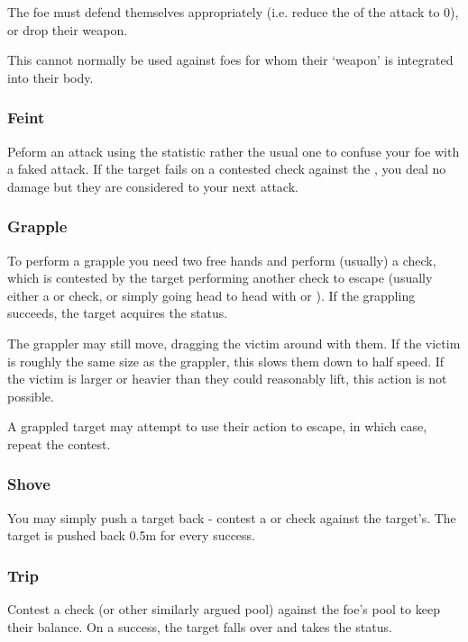 The foe must defend themselves appropriately (i.e. reduce the  of the attack to 0), or drop their weapon. 

This cannot normally be used against foes for whom their `weapon' is integrated into their body. 

\subsubsection{Feint}

Peform an attack using the  statistic rather the usual one to confuse your foe with a faked attack. If the target fails on a contested  check against the , you deal no damage but they are considered  to your next attack.  

\subsubsection{Grapple}

To perform a grapple you need two free hands and perform (usually) a  check, which is contested by the target performing another check to escape (usually either a  or  check, or simply going head to head with  or ). If the grappling succeeds, the target acquires the  status. 

The grappler may still move, dragging the victim around with them. If the victim is roughly the same size as the grappler, this slows them down to half speed. If the victim is larger or heavier than they could reasonably lift, this action is not possible. 

A grappled target may attempt to use their action to escape, in which case, repeat the contest. 


\subsubsection{Shove}

You may simply push a target back - contest a  or  check against the target's. The target is pushed back 0.5m for every success. 

\subsubsection{Trip}

Contest a  check (or other similarly argued pool) against the foe's  pool to keep their balance. On a success, the target falls over and takes the  status. 

